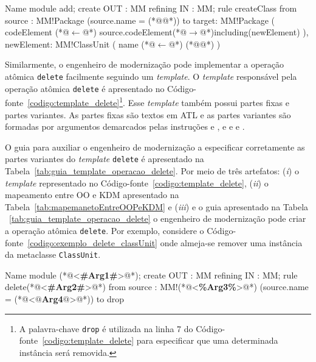 \begin{codigo}[caption={[ATL para realizar a operação atômica \texttt{add} \texttt{ClassUnit}.] ATL para realizar a operação atômica \texttt{add} \texttt{ClassUnit}.},escapeinside={(*@}{@*)}, basicstyle=\footnotesize, label={codigo:exemplo_add_classUnit}, language=ATL]{Name}
module add;
create OUT : MM refining IN : MM;
rule createClass{
	from
		source : MM!Package (source.name = (*@@*))
	to 
		target: MM!Package (
			codeElement (*@$\leftarrow$@*) source.codeElement(*@$\rightarrow$@*)including(newElement)
		),
		newElement: MM!ClassUnit (
			name (*@$\leftarrow$@*) (*@@*)
		)
}
\end{codigo}


Similarmente, o engenheiro de modernização pode implementar a operação atômica \texttt{delete} facilmente seguindo um \textit{template}. O \textit{template} responsável pela operação atômica \texttt{delete} é apresentado no Código-fonte~\ref{codigo:template_delete}\footnote{A palavra-chave \texttt{drop} é utilizada na linha 7 do Código-fonte~\ref{codigo:template_delete} para especificar que uma determinada instância será removida.}. Esse \textit{template} também possui partes fixas e partes variantes. As partes fixas são textos em ATL e as partes variantes são formadas por argumentos demarcados pelas instruções \aspas{\textbf{<\#}} e \aspas{\textbf{\#>}}, \aspas{\textbf{<\%}} e \aspas{\textbf{\%>}} e  e . 


O guia para auxiliar o engenheiro de modernização a especificar corretamente as partes variantes do \textit{template} \texttt{delete} é apresentado na Tabela~\ref{tab:guia_template_operacao_delete}. Por meio de três artefatos: (\textit{i}) o \textit{template} representado no Código-fonte~\ref{codigo:template_delete}, (\textit{ii}) o mapeamento entre OO e KDM apresentado na Tabela~\ref{tab:mapemanetoEntreOOPeKDM} e (\textit{iii}) e o guia apresentado na Tabela ~\ref{tab:guia_template_operacao_delete} o engenheiro de modernização pode criar a operação atômica \texttt{delete}. Por exemplo, considere o Código-fonte~\ref{codigo:exemplo_delete_classUnit} onde almeja-se remover uma instância da metaclasse \texttt{ClassUnit}. 

\begin{codigo}[caption={[\textit{Template} ATL para realizar a operação atômica \texttt{delete}.] \textit{Template} ATL para realizar a operação atômica \texttt{delete}.},escapeinside={(*@}{@*)}, basicstyle=\footnotesize, label={codigo:template_delete}, language=ATL]{Name}
module (*@<\textbf{\#Arg1\#}>@*);
create OUT : MM refining IN : MM;
rule delete(*@<\textbf{\#Arg2\#}>@*) {
  from
      source : MM!(*@<\textbf{\%Arg3\%}>@*) (source.name = (*@<\textbf{$@$Arg4$@$}>@*))
  to
      drop
}
\end{codigo}

